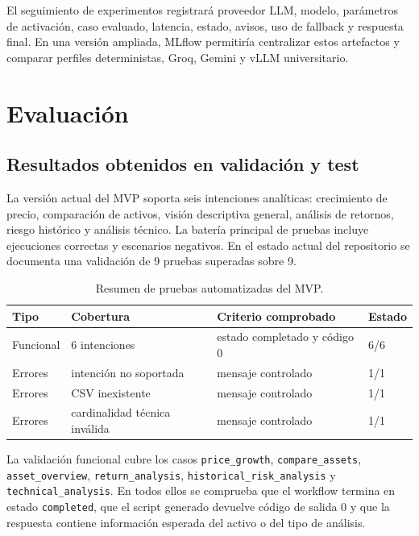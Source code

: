 \documentclass[11pt,a4paper]{article}
\let\oldsection\section
\renewcommand{\section}{\clearpage\oldsection}
\begin{document}
El seguimiento de experimentos registrar\'a proveedor LLM, modelo, par\'ametros de activaci\'on, caso evaluado, latencia, estado, avisos, uso de fallback y respuesta final. En una versi\'on ampliada, MLflow permitir\'ia centralizar estos artefactos y comparar perfiles deterministas, Groq, Gemini y vLLM universitario.

\section{Evaluaci\'on}

\subsection{Resultados obtenidos en validaci\'on y test}

La versi\'on actual del MVP soporta seis intenciones anal\'iticas: crecimiento de precio, comparaci\'on de activos, visi\'on descriptiva general, an\'alisis de retornos, riesgo hist\'orico y an\'alisis t\'ecnico. La bater\'ia principal de pruebas incluye ejecuciones correctas y escenarios negativos. En el estado actual del repositorio se documenta una validaci\'on de 9 pruebas superadas sobre 9.

\begin{table}[h]
\centering
\begin{tabular}{llll}
\toprule
\textbf{Tipo} & \textbf{Cobertura} & \textbf{Criterio comprobado} & \textbf{Estado} \\
\midrule
Funcional & 6 intenciones & estado completado y c\'odigo 0 & 6/6 \\
Errores & intenci\'on no soportada & mensaje controlado & 1/1 \\
Errores & CSV inexistente & mensaje controlado & 1/1 \\
Errores & cardinalidad t\'ecnica inv\'alida & mensaje controlado & 1/1 \\
\bottomrule
\end{tabular}
\caption{Resumen de pruebas automatizadas del MVP.}
\end{table}

La validaci\'on funcional cubre los casos \texttt{price\_growth}, \texttt{compare\_assets}, \texttt{asset\_overview}, \texttt{return\_analysis}, \texttt{historical\_risk\_analysis} y \texttt{technical\_analysis}. En todos ellos se comprueba que el workflow termina en estado \texttt{completed}, que el script generado devuelve c\'odigo de salida 0 y que la respuesta contiene informaci\'on esperada del activo o del tipo de an\'alisis.
\end{document}
